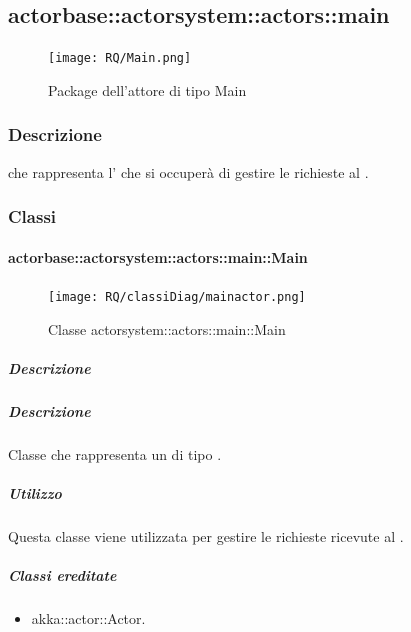 \documentclass{scalatekids-article}
\begin{document}
\subsection{actorbase::actorsystem::actors::main}
\label{sec:actorbase::actorsystem::actors::main}

\begin{figure}[H]
  \begin{center}
    \texttt{[image: RQ/Main.png]}
    \caption{Package dell'attore di tipo Main}
  \end{center}
\end{figure}

\subsubsection{Descrizione}
 che rappresenta l' che si occuperà di gestire le
richieste al .

\subsubsection{Classi}

\paragraph{actorbase::actorsystem::actors::main::Main}
\label{sec:actorbase::actorsystem::actors::main::Main}

\begin{figure}[H]
  \begin{center}
    \texttt{[image: RQ/classiDiag/mainactor.png]}
    \caption{Classe actorsystem::actors::main::Main}
  \end{center}
\end{figure}

\subparagraph{Descrizione}

\subparagraph{Descrizione}
Classe che rappresenta un  di tipo .

\subparagraph{Utilizzo}
Questa classe viene utilizzata per gestire le richieste ricevute al
.

\subparagraph{Classi ereditate}
\begin{itemize}
\item akka::actor::Actor.
\end{itemize}
\end{document}
